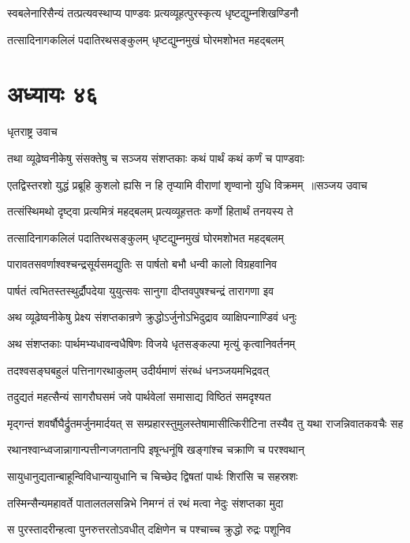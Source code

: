 \twolineshloka
{स्वबलेनारिसैन्यं तत्प्रत्यवस्थाप्य पाण्डवः}
{प्रत्यव्यूहत्पुरस्कृत्य धृष्टद्युम्नशिखण्डिनौ}


\twolineshloka
{तत्सादिनागकलिलं पदातिरथसङ्कुलम्}
{धृष्टद्युम्नमुखं घोरमशोभत महद्बलम्}


\chapter{अध्यायः ४६}
\twolineshloka
{धृतराष्ट्र उवाच}
{}


\twolineshloka
{तथा व्यूढेष्वनीकेषु संसक्तेषु च सञ्जय}
{संशप्तकाः कथं पार्थं कथं कर्णं च पाण्डवाः}


\threelineshloka
{एतद्विस्तरशो युद्धं प्रब्रूहि कुशलो ह्यसि}
{न हि तृप्यामि वीराणां शृण्वानो युधि विक्रमम् ॥सञ्जय उवाच}
{}


\twolineshloka
{तत्संस्थिमथो दृष्ट्वा प्रत्यमित्रं महद्बलम्}
{प्रत्यव्यूहत्ततः कर्णो हितार्थं तनयस्य ते}


\twolineshloka
{तत्सादिनागकलिलं पदातिरथसङ्कुलम्}
{धृष्टद्युम्नमुखं घोरमशोभत महद्बलम्}


\twolineshloka
{पारावतसवर्णाश्वश्चन्द्रसूर्यसमद्युतिः}
{स पार्षतो बभौ धन्वी कालो विग्रहवानिव}


\twolineshloka
{पार्षतं त्वभितस्तस्थुर्द्रौपदेया युयुत्सवः}
{सानुगा दीप्तवपुषश्चन्द्रं तारागणा इव}


\twolineshloka
{अथ व्यूढेष्वनीकेषु प्रेक्ष्य संशप्तकान्रणे}
{क्रुद्धोऽर्जुनोऽभिदुद्राव व्याक्षिपन्गाण्डिवं धनुः}


\twolineshloka
{अथ संशप्तकाः पार्थमभ्यधावन्वधैषिणः}
{विजये धृतसङ्कल्पा मृत्युं कृत्वानिवर्तनम्}


\twolineshloka
{तदश्वसङ्घबहुलं पत्तिनागरथाकुलम्}
{उदीर्यमाणं संरब्धं धनञ्जयमभिद्रवत्}


\twolineshloka
{तदुद्यतं महत्सैन्यं सागरौघसमं जवे}
{पार्थवेलां समासाद्य विष्ठितं समदृश्यत}


मृद्गन्तं शवर्षौघैर्द्रुतमर्जुनमार्दयत्
\twolineshloka
{स सम्प्रहारस्तुमुलस्तेषामासीत्किरीटिना}
{तस्यैव तु यथा राजन्निवातकवचैः सह}


\twolineshloka
{रथानश्वान्ध्वजान्नागान्पत्तीन्गजगतानपि}
{इषून्धनूंषि खङ्गांश्च चक्राणि च परश्वथान्}


\twolineshloka
{सायुधानुद्यतान्बाहून्विविधान्यायुधानि च}
{चिच्छेद द्विषतां पार्थः शिरांसि च सहस्रशः}


\twolineshloka
{तस्मिन्सैन्यमहावर्ते पातालतलसन्निभे}
{निमग्नं तं रथं मत्वा नेदुः संशप्तका मुदा}


\twolineshloka
{स पुरस्तादरीन्हत्वा पुनरुत्तरतोऽवधीत्}
{दक्षिणेन च पश्चाच्च क्रुद्धो रुद्रः पशूनिव}


